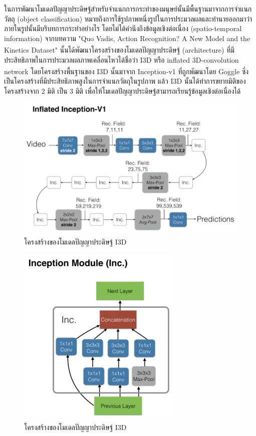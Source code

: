 ในการพัฒนาโมเดลปัญญาประดิษฐ์สำหรับจำแนกการกระทำของมนุษย์นั้นมีพื้นฐานมาจากการจำแนกวัตถุ (object classification)
หมายถึงการใช้รูปภาพหนึ่งรูปในการประมวลผลและทำนายออกมาว่าภายในรูปนั้นมีบริบทการกระทำอย่างไร โดยไม่ได้คำนึงถึงข้อมูลเชิงต่อเนื่อง (spatio-temporal information)
จากบทความ "Quo Vadis, Action Recognition? A New Model and the Kinetics Dataset"\textsuperscript{\cite{I3D}} นั้นได้พัฒนาโครงสร้างของโมเดลปัญญาประดิษฐ์ (architecture) 
ที่มีประสิทธิภาพในการประมวลผลภาพเคลื่อนไหวได้ชื่อว่า I3D หรือ inflated 3D-convolution network
โดยโครงสร้างพื้นฐานของ I3D นั้นมาจาก Inception-v1\textsuperscript{\cite{Inception}} ที่ถูกพัฒนาโดย Goggle ซึ่งเป็นโครงสร้างที่มีประสิทธิภาพสูงในการจำแนกวัตถุในรูปภาพ
แล้ว I3D นั้นได้ทำการขยายมิติของโครงสร้างจาก 2 มิติ เป็น 3 มิติ เพื่อให้โมเดลปัญญาประดิษฐ์สามารถเรียนรู้ข้อมูลเชิงต่อเนื่องได้
\begin{figure}[!ht]
    \centering
    \includegraphics[width=1.0\textwidth]{chapter2/images/I3D.png}
    \caption{โครงสร้างของโมเดลปัญญาประดิษฐ์ I3D\textsuperscript{\cite{I3D}}}
    \label{fig:I3DArch}
\end{figure}

\begin{figure}[!ht]
    \centering
    \includegraphics[width=0.7\textwidth]{chapter2/images/inceptionModule.png}
    \caption{โครงสร้างของโมเดลปัญญาประดิษฐ์ I3D\textsuperscript{\cite{I3D}}}
    \label{fig:I3DArch}
\end{figure}

